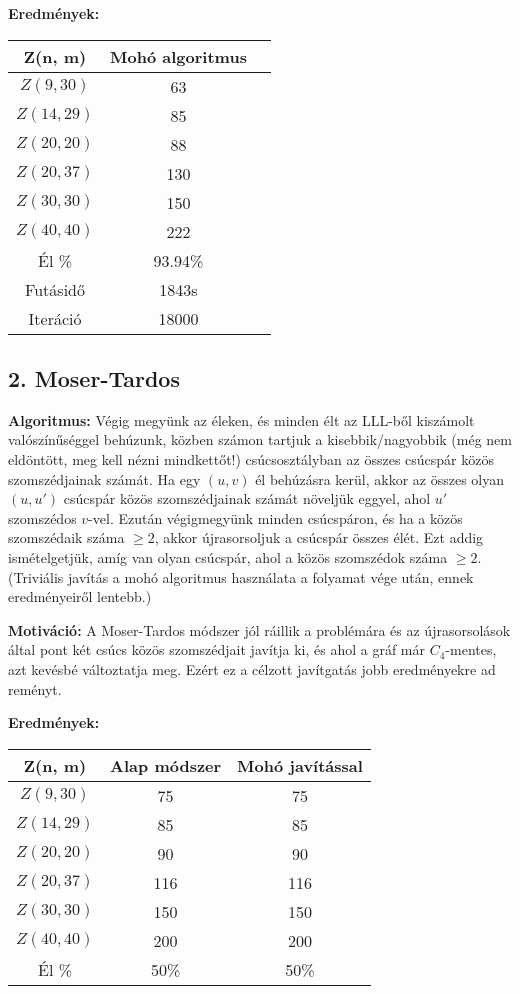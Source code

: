 \documentclass[12pt,a4paper]{article}
\begin{document}
\textbf{Eredmények:}
\begin{table}[H]
\centering
\begin{tabular}{|c|c|c|}
\hline
\textbf{Z(n, m)} & \textbf{Mohó algoritmus} \\
\hline
$Z(9,30)$  & 63 \\
$Z(14, 29)$ & 85 \\
$Z(20, 20)$ & 88 \\
$Z(20, 37)$ & 130 \\
$Z(30, 30)$ & 150 \\
$Z(40, 40)$ & 222 \\
\hline
Él \% & 93.94\% \\
\hline
Futásidő & 1843s \\
Iteráció & 18000 \\
\hline
\end{tabular}
\end{table}

\subsection*{2. Moser-Tardos}

\textbf{Algoritmus:} Végig megyünk az éleken, és minden élt az LLL-ből kiszámolt valószínűséggel behúzunk, közben számon tartjuk a kisebbik/nagyobbik (még nem eldöntött, meg kell nézni mindkettőt!) csúcsosztályban az összes csúcspár közös szomszédjainak számát. Ha egy $(u,v)$ él behúzásra kerül, akkor az összes olyan $(u,u')$ csúcspár közös szomszédjainak számát növeljük eggyel, ahol $u'$ szomszédos $v$-vel. Ezután végigmegyünk minden csúcspáron, és ha a közös szomszédaik száma $\geq 2$, akkor újrasorsoljuk a csúcspár összes élét. Ezt addig ismételgetjük, amíg van olyan csúcspár, ahol a közös szomszédok száma $\geq 2$. (Triviális javítás a mohó algoritmus használata a folyamat vége után, ennek eredményeiről lentebb.)

\textbf{Motiváció:} A Moser-Tardos módszer jól ráillik a problémára és az újrasorsolások által pont két csúcs közös szomszédjait javítja ki, és ahol a gráf már $C_4$-mentes, azt kevésbé változtatja meg. Ezért ez a célzott javítgatás jobb eredményekre ad reményt.

\textbf{Eredmények:}
\begin{table}[H]
\centering
\begin{tabular}{|c|c|c|}
\hline
\textbf{Z(n, m)} & \textbf{Alap módszer} & \textbf{Mohó javítással} \\
\hline
$Z(9,30)$  & 75 & 75 \\
$Z(14, 29)$ & 85 & 85 \\
$Z(20, 20)$ & 90 & 90 \\
$Z(20, 37)$ & 116 & 116 \\
$Z(30, 30)$ & 150 & 150 \\
$Z(40, 40)$ & 200 & 200 \\
\hline
Él \% & 50\% & 50\% \\
\hline
\end{tabular}
\end{table}
\end{document}
